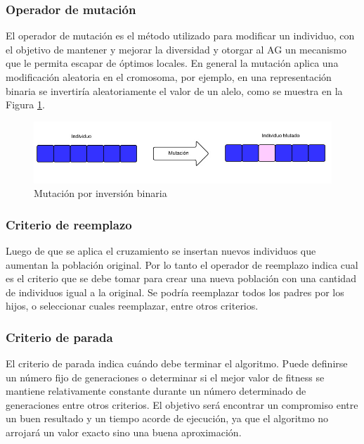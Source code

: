 \subsubsection{Operador de mutación} 
El operador de mutación es el método utilizado para modificar un individuo, con el objetivo de mantener y mejorar la diversidad y otorgar al AG un mecanismo que le permita escapar de óptimos locales. En general la mutación aplica una modificación aleatoria en el cromosoma, por ejemplo, en una representación binaria se invertiría aleatoriamente el valor de un alelo, como se muestra en la Figura \ref{fig:mutacion1}.
\begin{figure}[h]
	\centering
	\includegraphics[width=1\linewidth]{Figures/mutacion1}
	\caption{Mutación por inversión binaria}
	\label{fig:mutacion1}
\end{figure}


\subsubsection{Criterio de reemplazo} 
Luego de que se aplica el cruzamiento se insertan nuevos individuos que aumentan la población original. Por lo tanto el operador de reemplazo indica cual es el criterio que se debe tomar para crear una nueva población con una cantidad de individuos igual a la original.
Se podría reemplazar todos los padres por los hijos, o seleccionar cuales reemplazar, entre otros criterios.

\subsubsection{Criterio de parada} 
El criterio de parada indica cuándo debe terminar el algoritmo. Puede definirse un número fijo de generaciones o determinar si el mejor valor de fitness se mantiene relativamente constante durante un número determinado de generaciones entre otros criterios. El objetivo será encontrar un compromiso entre un buen resultado y un tiempo acorde de ejecución, ya que el algoritmo no arrojará un valor exacto sino una buena aproximación. 



%
%


